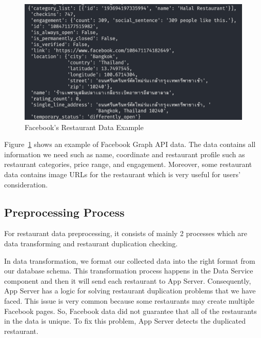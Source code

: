 \documentclass[12pt,oneside,openright,a4paper]{cpe-english-project}
\begin{document}
\newpage
\begin{figure}[H]\centering
\includegraphics[width=400pt]{./images/4FacebooksRestaurantDataExample.png}
\caption{Facebook’s Restaurant Data Example}\label{fig:4FacebooksRestaurantDataExample}
\end{figure}\vspace{-24pt}

Figure~\ref{fig:4FacebooksRestaurantDataExample} shows an example of Facebook Graph API data. The data contains all information we need such as name, coordinate and restaurant profile such as restaurant categories, price range, and engagement. Moreover, some restaurant data contains image URLs for the restaurant which is very useful for users’ consideration.

\subsection{Preprocessing Process}

For restaurant data preprocessing, it consists of mainly 2 processes which are data transforming and restaurant duplication checking.

In data transformation, we format our collected data into the right format from our database schema. This transformation process happens in the Data Service component and then it will send each restaurant to App Server. Consequently, App Server has a logic for solving restaurant duplication problems that we have faced. This issue is very common because some restaurants may create multiple Facebook pages. So, Facebook data did not guarantee that all of the restaurants in the data is unique. To fix this problem, App Server detects the duplicated restaurant.
\end{document}
